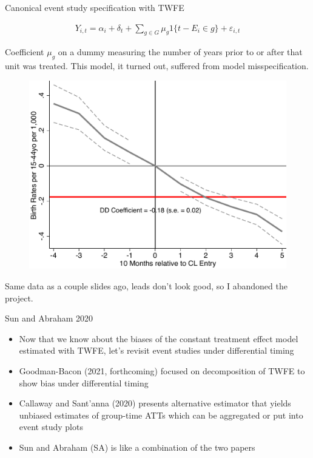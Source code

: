 \documentclass{beamer}
\begin{document}
\begin{frame}{Canonical event study specification with TWFE}


\begin{eqnarray*}
Y_{i,t} = \alpha_i + \delta_t + \sum_{g \in G} \mu_g1\{t-E_i \in g \} + \varepsilon_{i,t}
\end{eqnarray*}

\bigskip

Coefficient $\mu_g$ on a dummy measuring the number of years prior to or after that unit was treated.  This model, it turned out, suffered from model misspecification. 

\end{frame}

\begin{frame}[plain]
	\begin{figure}
	\includegraphics[scale=0.5]{./lecture_includes/br1544.pdf}
	\end{figure}
	
Same data as a couple slides ago, leads don't look good, so I abandoned the project. 
	
\end{frame}





\begin{frame}{Sun and Abraham 2020}

\begin{itemize}
\item Now that we know about the biases of the constant treatment effect model estimated with TWFE, let's revisit event studies under differential timing
\item Goodman-Bacon (2021, forthcoming) focused on decomposition of TWFE to show bias under differential timing
\item Callaway and Sant'anna (2020) presents alternative estimator that yields unbiased estimates of group-time ATTs which can be aggregated or put into event study plots
\item Sun and Abraham (SA) is like a combination of the two papers
\end{itemize}

\end{frame}
\end{document}
